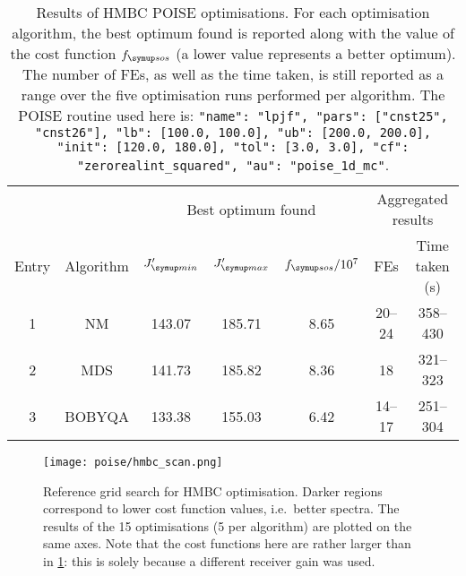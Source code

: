 \begin{table}[htb]
    \centering
    \begin{tabular}{ccccccc}
        \toprule
              &           & \multicolumn{3}{c}{Best optimum found} & \multicolumn{2}{c}{Aggregated results} \\
        \cmidrule(lr){3-5} \cmidrule(lr){6-7}
        Entry & Algorithm & $\Jmin'$ & $\Jmax'$ & $\fsos / 10^7$ & FEs & Time taken (\unit{\s}) \\
        \midrule
        1     & NM        & 143.07 & 185.71                 & 8.65 & 20--24 & 358--430 \\
        2     & MDS       & 141.73 & 185.82                 & 8.36 & 18     & 321--323 \\
        3     & BOBYQA    & 133.38 & 155.03                 & 6.42 & 14--17 & 251--304 \\
        \bottomrule
    \end{tabular}
    \caption[HMBC low-pass J-filter optimisations]{
        Results of HMBC POISE optimisations.
        For each optimisation algorithm, the best optimum found is reported along with the value of the cost function $\fsos$ (a lower value represents a better optimum).
        The number of FEs, as well as the time taken, is still reported as a range over the five optimisation runs performed per algorithm.
        The POISE routine used here is: \texttt{{"name": "lpjf", "pars": ["cnst25", "cnst26"], "lb": [100.0, 100.0], "ub": [200.0, 200.0], "init": [120.0, 180.0], "tol": [3.0, 3.0], "cf": "zerorealint_squared", "au": "poise_1d_mc"}}.
    }
    \label{tbl:poise_hmbc}
\end{table}

\begin{figure}[htb]
    \centering
    \texttt{[image: poise/hmbc\_scan.png]}%
    \caption[Reference grid search for HMBC optimisation]{
        Reference grid search for HMBC optimisation.
        Darker regions correspond to lower cost function values, i.e.\ better spectra.
        The results of the 15 optimisations (5 per algorithm) are plotted on the same axes.
        Note that the cost functions here are rather larger than in \cref{tbl:poise_hmbc}: this is solely because a different receiver gain was used.
    }
    \label{fig:poise_hmbc_scan}
\end{figure}

